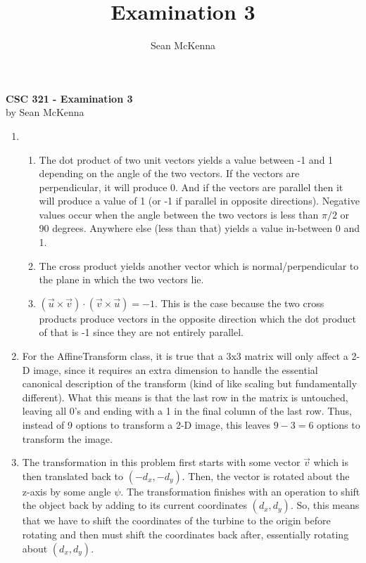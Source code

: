 \documentclass[11pt]{article}
\title{Examination 3}
\author{Sean McKenna}
\begin{document}
\begin{center}
  \textbf{CSC 321 - Examination 3} \\
  by Sean McKenna
\end{center}

\begin{enumerate}
  \item
    \begin{enumerate}
      \item The dot product of two unit vectors yields a value between -1 and 1 depending on the angle of the two vectors. If the vectors are perpendicular, it will produce 0. And if the vectors are parallel then it will produce a value of 1 (or -1 if parallel in opposite directions). Negative values occur when the angle between the two vectors is less than $\pi / 2$ or 90 degrees. Anywhere else (less than that) yields a value in-between 0 and 1.
      \item The cross product yields another vector which is normal/perpendicular to the plane in which the two vectors lie.
      \item $(\vec{u} \times \vec{v}) \cdot (\vec{v} \times \vec{u}) = -1$. This is the case because the two cross products produce vectors in the opposite direction which the dot product of that is -1 since they are not entirely parallel.
    \end{enumerate}

  \item For the AffineTransform class, it is true that a 3x3 matrix will only affect a 2-D image, since it requires an extra dimension to handle the essential canonical description of the transform (kind of like scaling but fundamentally different). What this means is that the last row in the matrix is untouched, leaving all 0's and ending with a 1 in the final column of the last row. Thus, instead of 9 options to transform a 2-D image, this leaves $9 - 3 = 6$ options to transform the image.

  \item The transformation in this problem first starts with some vector $\vec{v}$ which is then translated back to $(-d_x,-d_y)$. Then, the vector is rotated about the z-axis by some angle $\psi$. The transformation finishes with an operation to shift the object back by adding to its current coordinates $(d_x,d_y)$. So, this means that we have to shift the coordinates of the turbine to the origin before rotating and then must shift the coordinates back after, essentially rotating about $(d_x,d_y)$.


\end{enumerate}
\end{document}
